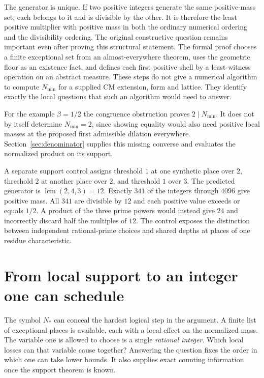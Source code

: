 \documentclass[12pt,letterpaper]{article}
\begin{document}
The generator is unique. If two positive integers generate the same positive-mass set, each belongs to it and is divisible by the other. It is therefore the least positive multiplier with positive mass in both the ordinary numerical ordering and the divisibility ordering. The original constructive question remains important even after proving this structural statement. The formal proof chooses a finite exceptional set from an almost-everywhere theorem, uses the geometric floor as an existence fact, and defines each first positive shell by a least-witness operation on an abstract measure. These steps do not give a numerical algorithm to compute $N_{\min}$ for a supplied CM extension, form and lattice. They identify exactly the local questions that such an algorithm would need to answer.

For the example $\beta=1/2$ the congruence obstruction proves $2\mid N_{\min}$. It does not by itself determine $N_{\min}=2$, since showing equality would also need positive local masses at the proposed first admissible dilation everywhere. Section~\ref{sec:denominator} supplies this missing converse and evaluates the normalized product on its support.

A separate support control assigns threshold $1$ at one synthetic place over $2$, threshold $2$ at another place over $2$, and threshold $1$ over $3$. The predicted generator is $\operatorname{lcm}(2,4,3)=12$. Exactly $341$ of the integers through $4096$ give positive mass. All $341$ are divisible by $12$ and each positive value exceeds or equals $1/2$. A product of the three prime powers would instead give $24$ and incorrectly discard half the multiples of $12$. The control exposes the distinction between independent rational-prime choices and shared depths at places of one residue characteristic.

\section{From local support to an integer one can schedule}\label{sec:schedule}
The symbol $N_*$ can conceal the hardest logical step in the argument. A finite list of exceptional places is available, each with a local effect on the normalized mass. The variable one is allowed to choose is a single \emph{rational integer}. Which local losses can that variable cause together? Answering the question fixes the order in which one can take lower bounds. It also supplies exact counting information once the support theorem is known.
\end{document}
